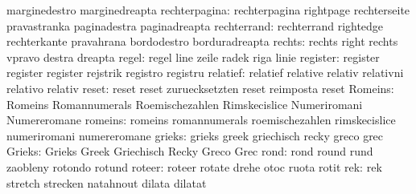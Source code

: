                            marginedestro             marginedreapta
            rechterpagina: rechterpagina             rightpage
                           rechterseite              pravastranka
                           paginadestra              paginadreapta
              rechterrand: rechterrand               rightedge
                           rechterkante              pravahrana
                           bordodestro               borduradreapta
                   rechts: rechts                    right
                           rechts                    vpravo
                           destra                    dreapta
                    regel: regel                     line
                           zeile                     radek
                           riga                      linie
                 register: register                  register
                           register                  rejstrik
                           registro                  registru
                 relatief: relatief                  relative
                           relativ                   relativni
                           relativo                  relativ
                    reset: reset                     reset
                           zuruecksetzten            reset
                           reimposta                 reset
                  Romeins: Romeins                   Romannumerals
                           Roemischezahlen           Rimskecislice
                           Numeriromani              Numereromane
                  romeins: romeins                   romannumerals
                           roemischezahlen           rimskecislice
                           numeriromani              numereromane
                   grieks: grieks                    greek
                           griechisch                recky
                           greco                     grec
                   Grieks: Grieks                    Greek
                           Griechisch                Recky
                           Greco                     Grec
                     rond: rond                      round
                           rund                      zaobleny
                           rotondo                   rotund
                   roteer: roteer                    rotate
                           drehe                     otoc
                           ruota                     rotit
                      rek: rek                       stretch
                           strecken                  natahnout
                           dilata                    dilatat

